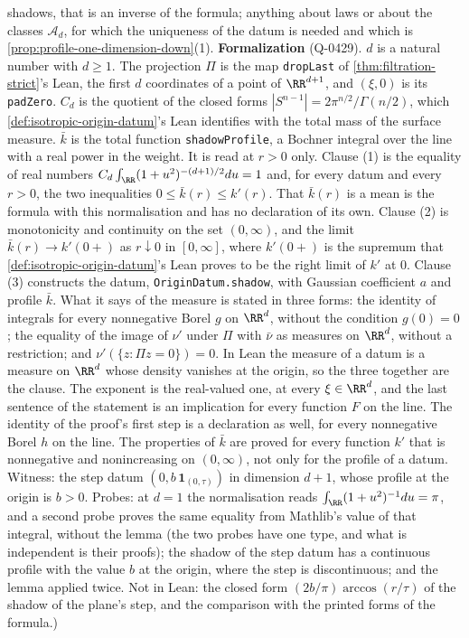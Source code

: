 \begin{lemma}
{shadows, that is an inverse of the formula; anything about laws or about the classes
$\mathcal{A}_d$, for which the uniqueness of the datum is needed and which is
\ref{prop:profile-one-dimension-down}(1). \textbf{Formalization} (Q-0429). $d$ is a natural
number with $d \ge 1$. The projection $\Pi$ is the map \texttt{dropLast} of
\ref{thm:filtration-strict}'s Lean, the first $d$ coordinates of a point of $\RR^{d+1}$, and
$(\xi,0)$ is its \texttt{padZero}. $C_d$ is the quotient of the closed forms
$|S^{n-1}| = 2\pi^{n/2}/\Gamma(n/2)$, which \ref{def:isotropic-origin-datum}'s Lean identifies
with the total mass of the surface measure. $\bar k$ is the total function
\texttt{shadowProfile}, a Bochner integral over the line with a real power in the weight. It is
read at $r > 0$ only. Clause (1) is the equality of real numbers
$C_d\int_{\RR}(1+u^2)^{-(d+1)/2}du = 1$ and, for every datum and every $r > 0$, the two
inequalities $0 \le \bar k(r) \le k'(r)$. That $\bar k(r)$ is a mean is the formula with this
normalisation and has no declaration of its own. Clause (2) is monotonicity and continuity on
the set $(0,\infty)$, and the limit $\bar k(r) \to k'(0{+})$ as $r \downarrow 0$ in
$[0,\infty]$, where $k'(0{+})$ is the supremum that \ref{def:isotropic-origin-datum}'s Lean
proves to be the right limit of $k'$ at $0$. Clause (3) constructs the datum,
\texttt{OriginDatum.shadow}, with Gaussian coefficient $a$ and profile $\bar k$. What it says of
the \Levy{} measure is stated in three forms: the identity of integrals for every nonnegative
Borel $g$ on $\RR^d$, without the condition $g(0) = 0$; the equality of the image of $\nu'$
under $\Pi$ with $\bar\nu$ as measures on $\RR^d$, without a restriction; and
$\nu'(\{z : \Pi z = 0\}) = 0$. In Lean the \Levy{} measure of a datum is a measure on $\RR^d$
whose density vanishes at the origin, so the three together are the clause. The exponent is the
real-valued one, at every $\xi \in \RR^d$, and the last sentence of the statement is an
implication for every function $F$ on the line. The identity of the proof's first step is a
declaration as well, for every nonnegative Borel $h$ on the line. The properties of $\bar k$ are
proved for every function $k'$ that is nonnegative and nonincreasing on $(0,\infty)$, not only
for the profile of a datum. Witness: the step datum $(0, b\,\mathbf 1_{(0,\tau)})$ in dimension
$d + 1$, whose profile at the origin is $b > 0$. Probes: at $d = 1$ the normalisation reads
$\int_{\RR}(1+u^2)^{-1}du = \pi$, and a second probe proves the same equality from Mathlib's
value of that integral, without the lemma (the two probes have one type, and what is independent
is their proofs); the shadow of the step datum
has a continuous profile with the value $b$ at the origin, where the step is discontinuous; and
the lemma applied twice. Not in Lean: the closed form $(2b/\pi)\arccos(r/\tau)$ of the shadow of
the plane's step, and the comparison with the printed forms of the formula.)}
\end{lemma}

